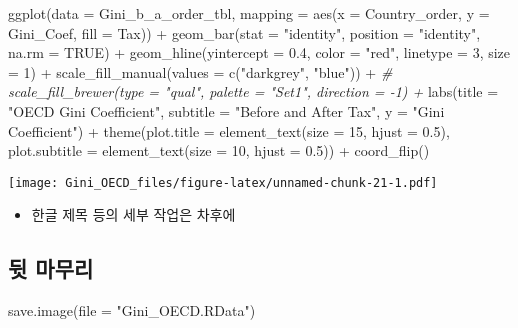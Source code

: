 \documentclass[
]{article}
\newenvironment{Shaded}{\begin{snugshade}}{\end{snugshade}}
\newcommand{\AttributeTok}[1]{\textcolor[rgb]{0.77,0.63,0.00}{#1}}
\newcommand{\CommentTok}[1]{\textcolor[rgb]{0.56,0.35,0.01}{\textit{#1}}}
\newcommand{\ConstantTok}[1]{\textcolor[rgb]{0.00,0.00,0.00}{#1}}
\newcommand{\DecValTok}[1]{\textcolor[rgb]{0.00,0.00,0.81}{#1}}
\newcommand{\FloatTok}[1]{\textcolor[rgb]{0.00,0.00,0.81}{#1}}
\newcommand{\FunctionTok}[1]{\textcolor[rgb]{0.00,0.00,0.00}{#1}}
\newcommand{\NormalTok}[1]{#1}
\newcommand{\SpecialCharTok}[1]{\textcolor[rgb]{0.00,0.00,0.00}{#1}}
\newcommand{\StringTok}[1]{\textcolor[rgb]{0.31,0.60,0.02}{#1}}
\providecommand{\tightlist}{%
  \setlength{\itemsep}{0pt}\setlength{\parskip}{0pt}}
\begin{document}
\begin{Shaded}
\begin{Highlighting}[]
\FunctionTok{ggplot}\NormalTok{(}\AttributeTok{data =}\NormalTok{ Gini\_b\_a\_order\_tbl, }
       \AttributeTok{mapping =} \FunctionTok{aes}\NormalTok{(}\AttributeTok{x =}\NormalTok{ Country\_order, }
                     \AttributeTok{y =}\NormalTok{ Gini\_Coef, }
                     \AttributeTok{fill =}\NormalTok{ Tax)) }\SpecialCharTok{+} 
  \FunctionTok{geom\_bar}\NormalTok{(}\AttributeTok{stat =} \StringTok{"identity"}\NormalTok{, }
           \AttributeTok{position =} \StringTok{"identity"}\NormalTok{, }
           \AttributeTok{na.rm =} \ConstantTok{TRUE}\NormalTok{) }\SpecialCharTok{+}
  \FunctionTok{geom\_hline}\NormalTok{(}\AttributeTok{yintercept =} \FloatTok{0.4}\NormalTok{, }
             \AttributeTok{color =} \StringTok{"red"}\NormalTok{, }
             \AttributeTok{linetype =} \DecValTok{3}\NormalTok{, }
             \AttributeTok{size =} \DecValTok{1}\NormalTok{) }\SpecialCharTok{+}
  \FunctionTok{scale\_fill\_manual}\NormalTok{(}\AttributeTok{values =} \FunctionTok{c}\NormalTok{(}\StringTok{"darkgrey"}\NormalTok{, }\StringTok{"blue"}\NormalTok{)) }\SpecialCharTok{+}
\CommentTok{\#   scale\_fill\_brewer(type = "qual", palette = "Set1", direction = {-}1) +}
  \FunctionTok{labs}\NormalTok{(}\AttributeTok{title =} \StringTok{"OECD Gini Coefficient"}\NormalTok{, }
       \AttributeTok{subtitle =} \StringTok{"Before and After Tax"}\NormalTok{, }
       \AttributeTok{y =} \StringTok{"Gini Coefficient"}\NormalTok{) }\SpecialCharTok{+}
  \FunctionTok{theme}\NormalTok{(}\AttributeTok{plot.title =} \FunctionTok{element\_text}\NormalTok{(}\AttributeTok{size =} \DecValTok{15}\NormalTok{, }\AttributeTok{hjust =} \FloatTok{0.5}\NormalTok{),}
        \AttributeTok{plot.subtitle =} \FunctionTok{element\_text}\NormalTok{(}\AttributeTok{size =} \DecValTok{10}\NormalTok{, }\AttributeTok{hjust =} \FloatTok{0.5}\NormalTok{)) }\SpecialCharTok{+}
\FunctionTok{coord\_flip}\NormalTok{()}
\end{Highlighting}
\end{Shaded}

\texttt{[image: Gini\_OECD\_files/figure-latex/unnamed-chunk-21-1.pdf]}

\begin{itemize}
\tightlist
\item
  한글 제목 등의 세부 작업은 차후에
\end{itemize}

\hypertarget{uxb4b7-uxb9c8uxbb34uxb9ac}{%
\subsection{뒷 마무리}\label{uxb4b7-uxb9c8uxbb34uxb9ac}}

\begin{Shaded}
\begin{Highlighting}[]
\FunctionTok{save.image}\NormalTok{(}\AttributeTok{file =} \StringTok{"Gini\_OECD.RData"}\NormalTok{)}
\end{Highlighting}
\end{Shaded}
\end{document}
